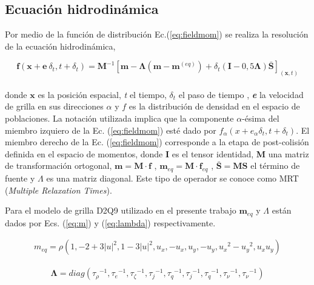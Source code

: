 \subsection{Ecuación hidrodinámica}

Por medio de la función de distribución Ec.(\ref{eq:fieldmom}) \cite{li2013lattice} se realiza la resolución de la ecuación hidrodinámica,


\begin{equation}
    \mathbf{f}(\mathbf{x} + \mathbf{e} \> \delta_{t} , t + \delta_{t}) = \mathbf{M}^{-1} \left[ \mathbf{m} - \mathbf{\Lambda}(\mathbf{m} - \mathbf{m}^{(eq)}) + \delta_{t} \left( \mathbf{I} - 0,5 \mathbf{\Lambda} \right) \mathbf{\bar{S}}  \right]_{(\mathbf{x},t)} 
    \label{eq:fieldmom}
\end{equation}\\
donde $\mathbf{x}$ es la posición espacial, \textit{t} el tiempo, $\delta_{t}$ el paso de tiempo , \textit{\textbf{e}} la velocidad de grilla en sus direcciones $\alpha$ y $\textit{f}$ es la distribución de densidad en el espacio de poblaciones. La notación utilizada implica que la componente $\alpha$-ésima del miembro izquiero de la Ec. (\ref{eq:fieldmom}) esté dado por $f_{\alpha}(x + e_{\alpha} \delta_{t}  , t + \delta_{t} )$. El miembro derecho de la Ec. (\ref{eq:fieldmom}) corresponde a la etapa de post-colisión definida en el espacio de momentos, donde \textbf{I} es el tensor identidad, \textbf{M} una matriz de transformación ortogonal, $\mathbf{m} = \mathbf{M} \cdot \mathbf{f}$ , $\mathbf{m}_{eq} = \mathbf{M} \cdot \mathbf{f}_{eq}$ , $\mathbf{\bar{S}} = \mathbf{M} \mathbf{S}$ el término de fuente y $ \Lambda$ es una matriz diagonal. Este tipo de operador se conoce como MRT (\textit{Multiple Relaxation Times}).

Para el modelo de grilla D2Q9 utilizado en el presente trabajo $\mathbf{m}_{eq}$ y $ \Lambda$ están dados por Ecs. (\ref{eq:m}) y (\ref{eq:lambda}) respectivamente.

\begin{align}
m_{eq} =  \rho  \left( 1, - 2 + 3 {|u|}^{2} , 1 - 3{|u|}^{2} , u_{x} , - u_{x} , u_{y} , - u_{y} , {u_{x}}^{2} - {u_{y}}^{2} , u_{x} u_{y} \right) 
\label{eq:m}
\end{align}

    
\begin{align}
    \mathbf{\Lambda}  = diag ( {\tau_{\rho }}^{-1},{\tau_{e}}^{-1},{\tau_{\zeta }}^{-1},{\tau_{j}}^{-1},{\tau_{q}}^{-1},{\tau_{j}}^{-1},{\tau_{q}}^{-1},{\tau_{\nu }}^{-1},{\tau_{\nu}}^{-1}) 
    \label{eq:lambda}
\end{align}


